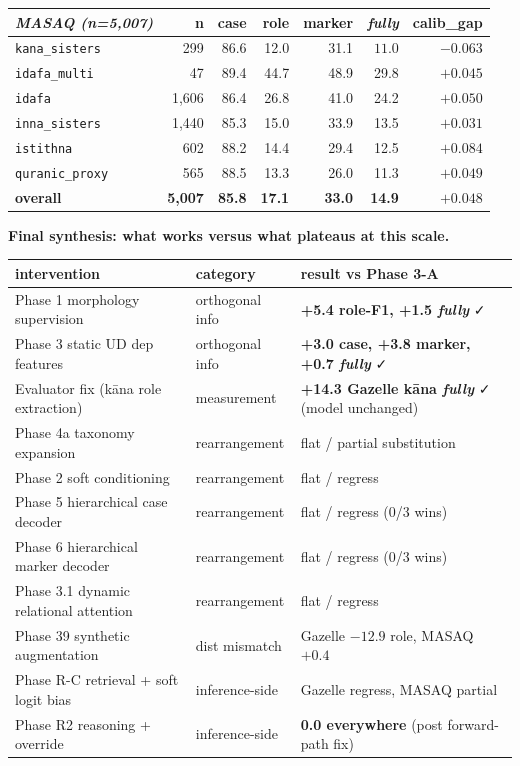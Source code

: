 \documentclass[10pt,a4paper,twocolumn]{article}
\begin{document}
\medskip
\begin{tabular}{l r r r r r r}
\toprule
\textit{MASAQ (n=5,007)} & n & case & role & marker & \emph{fully} & calib\_gap \\
\midrule
\texttt{kana\_sisters} & 299 & 86.6 & 12.0 & 31.1 & $\mathbf{11.0}$ & $-0.063$ \\
\texttt{idafa\_multi} & 47 & 89.4 & 44.7 & 48.9 & 29.8 & $+0.045$ \\
\texttt{idafa} & 1{,}606 & 86.4 & 26.8 & 41.0 & 24.2 & $+0.050$ \\
\texttt{inna\_sisters} & 1{,}440 & 85.3 & 15.0 & 33.9 & 13.5 & $+0.031$ \\
\texttt{istithna} & 602 & 88.2 & 14.4 & 29.4 & 12.5 & $+0.084$ \\
\texttt{quranic\_proxy} & 565 & 88.5 & 13.3 & 26.0 & 11.3 & $+0.049$ \\
\textbf{overall} & \textbf{5{,}007} & \textbf{85.8} & \textbf{17.1} & \textbf{33.0} & \textbf{14.9} & $+0.048$ \\
\bottomrule
\end{tabular}

\medskip
\noindent\textbf{Final synthesis: what works versus what plateaus at this scale.}

\begin{tabular}{l l l}
\toprule
intervention & category & result vs Phase 3-A \\
\midrule
Phase 1 morphology supervision & orthogonal info & \textbf{+5.4 role-F1, +1.5 \emph{fully}} ✓ \\
Phase 3 static UD dep features & orthogonal info & \textbf{+3.0 case, +3.8 marker, +0.7 \emph{fully}} ✓ \\
Evaluator fix (kāna role extraction) & measurement & \textbf{+14.3 Gazelle kāna \emph{fully}} ✓ (model unchanged) \\
Phase 4a taxonomy expansion & rearrangement & flat / partial substitution \\
Phase 2 soft conditioning & rearrangement & flat / regress \\
Phase 5 hierarchical case decoder & rearrangement & flat / regress (0/3 wins) \\
Phase 6 hierarchical marker decoder & rearrangement & flat / regress (0/3 wins) \\
Phase 3.1 dynamic relational attention & rearrangement & flat / regress \\
Phase 39 synthetic augmentation & dist mismatch & Gazelle $-12.9$ role, MASAQ $+0.4$ \\
Phase R-C retrieval + soft logit bias & inference-side & Gazelle regress, MASAQ partial \\
Phase R2 reasoning + override & inference-side & \textbf{0.0 everywhere} (post forward-path fix) \\
\bottomrule
\end{tabular}
\end{document}
